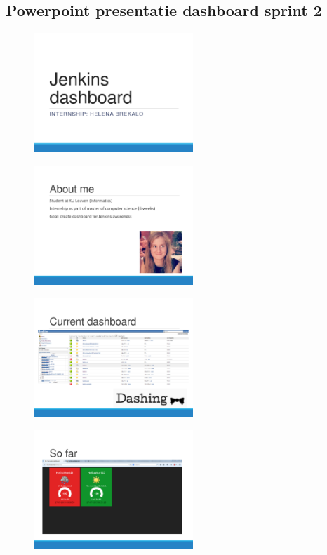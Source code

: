 \documentclass[10pt,a4paper]{article}
\begin{document}
\begin{appendices}
\clearpage

\section{Powerpoint presentatie dashboard sprint 2}
\label{ppt}

\begin{figure}[!h]
\centering
\begin{minipage}{0.45\textwidth}
\centering
\includegraphics[width=60mm]{ppt1.pdf}
\label{standup}
\end{minipage}\hfill
\begin{minipage}{0.45\textwidth}
\centering
\includegraphics[width=60mm]{ppt2.pdf}
\label{jira}
\end{minipage}
\end{figure}

\begin{figure}[!h]
\centering
\begin{minipage}{0.45\textwidth}
\centering
\includegraphics[width=60mm]{ppt3.pdf}
\label{standup}
\end{minipage}\hfill
\begin{minipage}{0.45\textwidth}
\centering
\includegraphics[width=60mm]{ppt4.pdf}
\label{jira}
\end{minipage}
\end{figure}


\end{appendices}
\end{document}
